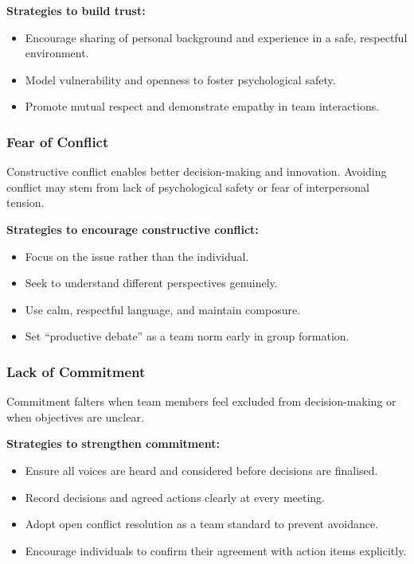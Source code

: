 \documentclass{article}
\begin{document}
\textbf{Strategies to build trust:}
\begin{itemize}
    \item Encourage sharing of personal background and experience in a safe, respectful environment.
    \item Model vulnerability and openness to foster psychological safety.
    \item Promote mutual respect and demonstrate empathy in team interactions.
\end{itemize}

\subsubsection{Fear of Conflict}

Constructive conflict enables better decision-making and innovation. Avoiding conflict may stem from lack of psychological safety or fear of interpersonal tension.

\textbf{Strategies to encourage constructive conflict:}
\begin{itemize}
    \item Focus on the issue rather than the individual.
    \item Seek to understand different perspectives genuinely.
    \item Use calm, respectful language, and maintain composure.
    \item Set “productive debate” as a team norm early in group formation.
\end{itemize}

\subsubsection{Lack of Commitment}

Commitment falters when team members feel excluded from decision-making or when objectives are unclear.

\vspace{1em}
\textbf{Strategies to strengthen commitment:}
\begin{itemize}
    \item Ensure all voices are heard and considered before decisions are finalised.
    \item Record decisions and agreed actions clearly at every meeting.
    \item Adopt open conflict resolution as a team standard to prevent avoidance.
    \item Encourage individuals to confirm their agreement with action items explicitly.
\end{itemize}
\end{document}

